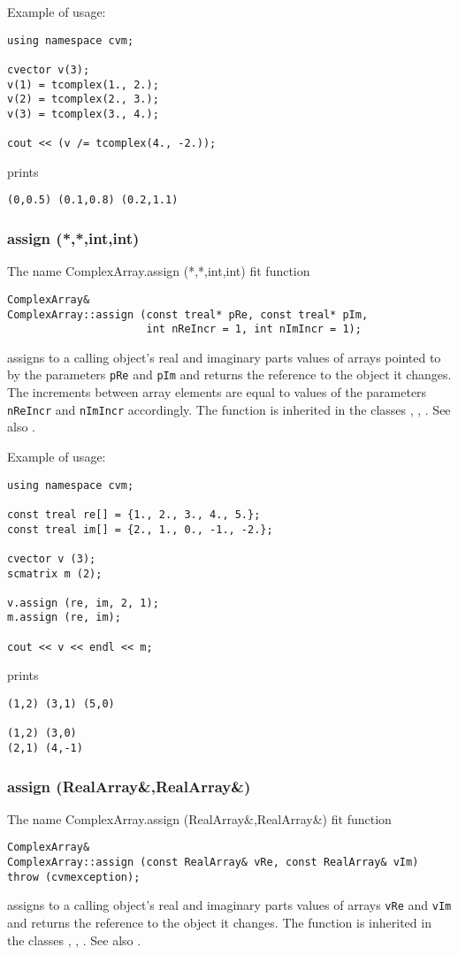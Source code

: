 Example of usage:
\begin{verbatim}
using namespace cvm;

cvector v(3);
v(1) = tcomplex(1., 2.);
v(2) = tcomplex(2., 3.);
v(3) = tcomplex(3., 4.);

cout << (v /= tcomplex(4., -2.));
\end{verbatim}
prints
\begin{verbatim}
(0,0.5) (0.1,0.8) (0.2,1.1)
\end{verbatim}
\newpage




\subsubsection{assign (*,*,int,int)}
The%
\pdfdest name {ComplexArray.assign (*,*,int,int)} fit{ }
function
\begin{verbatim}
ComplexArray&
ComplexArray::assign (const treal* pRe, const treal* pIm,
                      int nReIncr = 1, int nImIncr = 1);
\end{verbatim}
assigns to a calling object's real and imaginary parts
values of arrays pointed to by the parameters
\verb"pRe" and \verb"pIm" and returns the reference to
the object it changes. The increments between array elements
are equal to values of the parameters \verb"nReIncr" and \verb"nImIncr"
accordingly.
The function is inherited in the classes
,
,
.
See also .

Example of usage:
\begin{verbatim}
using namespace cvm;

const treal re[] = {1., 2., 3., 4., 5.};
const treal im[] = {2., 1., 0., -1., -2.};

cvector v (3);
scmatrix m (2);

v.assign (re, im, 2, 1);
m.assign (re, im);

cout << v << endl << m;
\end{verbatim}
prints
\begin{verbatim}
(1,2) (3,1) (5,0)

(1,2) (3,0)
(2,1) (4,-1)
\end{verbatim}
\newpage


\subsubsection{assign (RealArray\&,RealArray\&)}
The%
\pdfdest name {ComplexArray.assign (RealArray&,RealArray&)} fit{ }
function
\begin{verbatim}
ComplexArray&
ComplexArray::assign (const RealArray& vRe, const RealArray& vIm)
throw (cvmexception);
\end{verbatim}
assigns to a calling object's real and imaginary parts
values of arrays
\verb"vRe" and \verb"vIm" and returns the reference to
the object it changes.
The function is inherited in the classes
,
,
.
See also .

